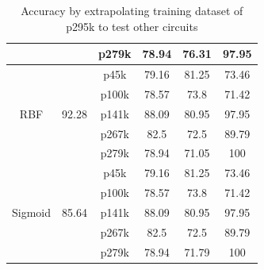 \begin{table}[h]
{\begin{tabular}{cccccc}
                            &                                                 & p279k                    & 78.94            & 76.31         & 97.95                      \\
\hline
\multirow{5}{*}{RBF}        & \multirow{5}{*}{92.28}                          & p45k                     & 79.16            & 81.25         & 73.46                      \\
                            &                                                 & p100k                    & 78.57            & 73.8          & 71.42                      \\
                            &                                                 & p141k                    & 88.09            & 80.95         & 97.95                      \\
                            &                                                 & p267k                    & 82.5             & 72.5          & 89.79                      \\
                            &                                                 & p279k                    & 78.94            & 71.05         & 100                        \\
\hline
\multirow{5}{*}{Sigmoid}    & \multirow{5}{*}{85.64}                          & p45k                     & 79.16            & 81.25         & 73.46                      \\
                            &                                                 & p100k                    & 78.57            & 73.8          & 71.42                      \\
                            &                                                 & p141k                    & 88.09            & 80.95         & 97.95                      \\
                            &                                                 & p267k                    & 82.5             & 72.5          & 89.79                      \\
                            &                                                 & p279k                    & 78.94            & 71.79         & 100                       \\
\hline
\end{tabular}
}
\caption{Accuracy by extrapolating training dataset of p295k to test other circuits}
\label{tab:univ295k}
\end{table}

